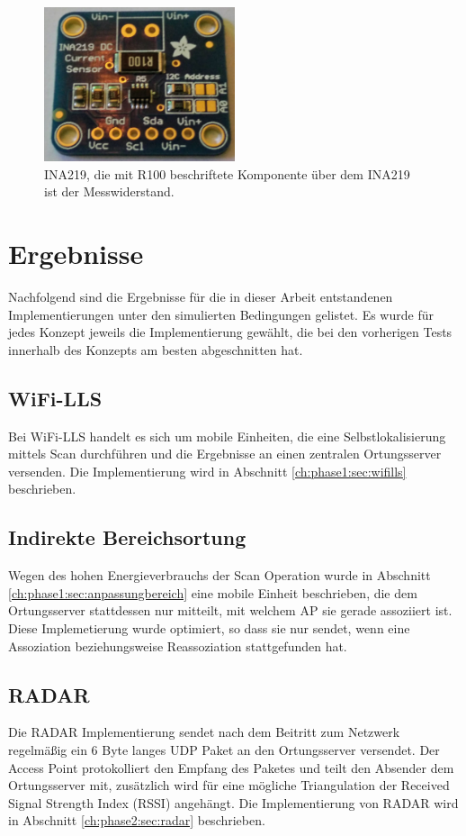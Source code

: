 \begin{figure}[h]
  \centering
	\includegraphics[width=0.5\textwidth]{images/ina219.jpg}
  \caption{INA219, die mit R100 beschriftete Komponente über dem INA219 ist der Messwiderstand.}
  \label{fig:ina219}
\end{figure}

\section{Ergebnisse}
Nachfolgend sind die Ergebnisse für die in dieser Arbeit entstandenen Implementierungen unter den simulierten Bedingungen gelistet.
Es wurde für jedes Konzept jeweils die Implementierung gewählt, die bei den vorherigen Tests innerhalb des Konzepts am besten abgeschnitten hat.\\


\subsection{WiFi-LLS}
\label{ch:realworld:sec:wifills}
Bei WiFi-LLS handelt es sich um mobile Einheiten, die eine Selbstlokalisierung mittels Scan durchführen und die Ergebnisse an einen zentralen Ortungsserver versenden.
Die Implementierung wird in Abschnitt \ref{ch:phase1:sec:wifills} beschrieben.

\subsection{Indirekte Bereichsortung}
\label{ch:realworld:sec:indirekt}
Wegen des hohen Energieverbrauchs der Scan Operation wurde in Abschnitt \ref{ch:phase1:sec:anpassungbereich} eine mobile Einheit beschrieben, die dem Ortungsserver stattdessen nur mitteilt, mit welchem AP sie gerade assoziiert ist. 
Diese Implemetierung wurde optimiert, so dass sie nur sendet, wenn eine Assoziation beziehungsweise Reassoziation stattgefunden hat.

\subsection{RADAR}
Die RADAR Implementierung sendet nach dem Beitritt zum Netzwerk regelmäßig ein 6 Byte langes UDP Paket an den Ortungsserver versendet.
Der Access Point protokolliert den Empfang des Paketes und teilt den Absender dem Ortungsserver mit, zusätzlich wird für eine mögliche Triangulation der Received Signal Strength Index (RSSI) angehängt.
Die Implementierung von RADAR wird in Abschnitt \ref{ch:phase2:sec:radar} beschrieben.

